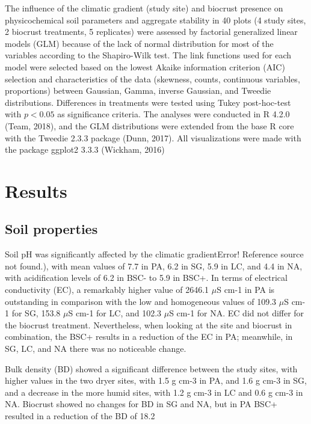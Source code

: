 The influence of the climatic gradient (study site) and biocrust presence on physicochemical soil parameters and aggregate stability in 40 plots (4 study sites, 2 biocrust treatments, 5 replicates) were assessed by factorial generalized linear models (GLM) because of the lack of normal distribution for most of the variables according to the Shapiro-Wilk test. The link functions used for each model were selected based on the lowest Akaike information criterion (AIC) selection and characteristics of the data (skewness, counts, continuous variables, proportions) between Gaussian, Gamma, inverse Gaussian, and Tweedie distributions. Differences in treatments were tested using Tukey post-hoc-test with $p <0.05$ as significance criteria. The analyses were conducted in R 4.2.0 (Team, 2018), and the GLM distributions were extended from the base R core with the Tweedie 2.3.3 package (Dunn, 2017). All visualizations were made with the package ggplot2 3.3.3 (Wickham, 2016)

\section{Results}
\subsection{Soil properties}

Soil pH was significantly affected by the climatic gradientError! Reference source not found.), with mean values of 7.7 in PA, 6.2 in SG, 5.9 in LC, and 4.4 in NA, with acidification levels of 6.2 in BSC- to 5.9 in BSC+. In terms of electrical conductivity (EC), a remarkably higher value of 2646.1 $\mu$S cm-1 in PA is outstanding in comparison with the low and homogeneous values of 109.3 $\mu$S cm-1 for SG, 153.8 $\mu$S cm-1 for LC, and 102.3 $\mu$S cm-1 for NA. EC did not differ for the biocrust treatment. Nevertheless, when looking at the site and biocrust in combination, the BSC+ results in a reduction of the EC in PA; meanwhile, in SG, LC, and NA there was no noticeable change. 

Bulk density (BD) showed a significant difference between the study sites, with higher values in the two dryer sites, with 1.5 g cm-3 in PA, and 1.6 g cm-3 in SG, and a decrease in the more humid sites, with 1.2 g cm-3 in LC and 0.6 g cm-3 in NA. Biocrust showed no changes for BD in SG and NA, but in PA BSC+ resulted in a reduction of the BD of 18.2%


